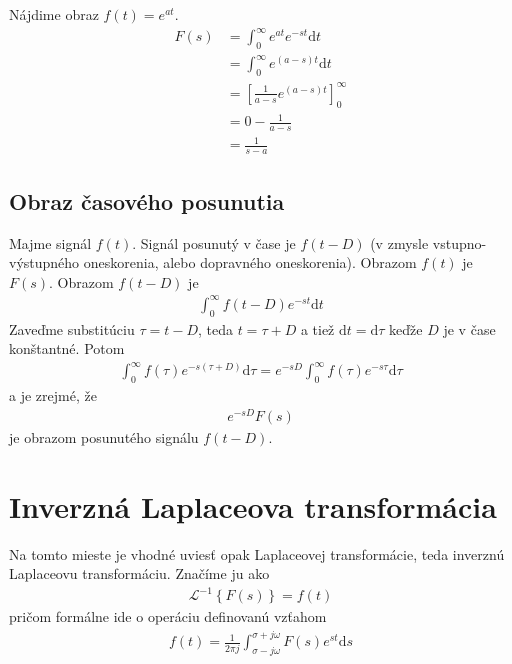 \documentclass[a4paper, 10pt, ]{article}
\begin{document}
Nájdime obraz $f(t) = e^{at}$.
\begin{equation}
    \begin{aligned}
        F(s) &= \int_0^\infty e^{at} e^{-st}\text{d}t \\
        &= \int_0^\infty e^{(a-s)t}\text{d}t \\
        &= \left[ \frac{1}{a-s} e^{(a-s)t} \right]_0^\infty \\
        &= 0 - \frac{1}{a-s} \\
        &= \frac{1}{s - a}
    \end{aligned}
\end{equation}




\subsection{Obraz časového posunutia}

Majme signál $f(t)$. Signál posunutý v čase je $f(t-D)$ (v zmysle vstupno-výstupného oneskorenia, alebo dopravného oneskorenia). Obrazom $f(t)$ je $F(s)$. Obrazom $f(t-D)$ je
\begin{align}
    \int_0^\infty f(t-D) e^{-st} \text{d}t
\end{align}
Zaveďme substitúciu $\tau  = t-D$, teda $t=\tau+D$ a tiež $\text{d}t = \text{d}\tau$ keďže $D$ je v čase konštantné. Potom
\begin{align}
    \int_0^\infty f(\tau) e^{-s(\tau+D)} \text{d}\tau = e^{-sD} \int_0^\infty f(\tau) e^{-s\tau} \text{d}\tau
\end{align}
a je zrejmé, že
\begin{align}
    e^{-sD} F(s)
\end{align}
je obrazom posunutého signálu $f(t-D)$.




\section{Inverzná Laplaceova transformácia}

Na tomto mieste je vhodné uviesť opak Laplaceovej transformácie, teda inverznú Laplaceovu transformáciu. Značíme ju ako
\begin{align}
    \mathcal L ^{-1} \left\{ F(s) \right\} = f(t)
\end{align}
pričom formálne ide o operáciu definovanú vzťahom
\begin{align}
    f(t) = \frac{1}{2\pi j} \int_{\sigma-j\omega}^{\sigma + j\omega} F(s) e^{st} \text{d}s
\end{align}
\end{document}
